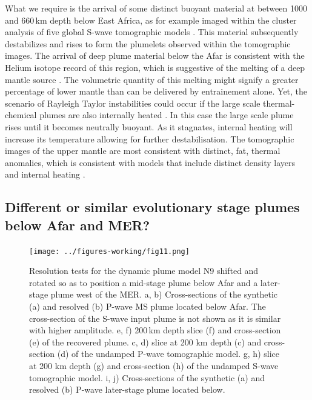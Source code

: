 \documentclass[a4paper,10pt,twocolumn]{paper}
\begin{document}
What we require is the arrival of some distinct buoyant material at between 1000 and 660\,km depth below East Africa, as for example imaged within the cluster analysis of five global S-wave tomographic models \citep{cottaar-2016}. This material subsequently destabilizes and rises to form the plumelets observed within the tomographic images. The arrival of deep plume material below the Afar is consistent with the Helium isotope record of this region, which is suggestive of the melting of a deep mantle source \citep{pik-etal-1999}. The volumetric quantity of this melting might signify a greater percentage of lower mantle than can be delivered by entrainement alone. Yet, the scenario of Rayleigh Taylor instabilities could occur if the large scale thermal-chemical plumes are also internally heated \citep{fourel-etal-2017}. In this case the large scale plume rises until it becomes neutrally buoyant. As it stagnates, internal heating will increase its temperature allowing for further destabilisation. The tomographic images of the upper mantle are most consistent with distinct, fat, thermal anomalies, which is consistent with models that include distinct density layers and internal heating \citep{fourel-etal-2017}. 

\subsection{Different or similar evolutionary stage plumes below Afar and MER?}

\begin{figure}
\centering
\texttt{[image: ../figures-working/fig11.png]}
\caption{Resolution tests for the dynamic plume model N9 shifted and rotated so as to position a mid-stage plume below Afar and a later-stage plume west of the MER. a, b) Cross-sections of the synthetic (a) and resolved (b) P-wave MS plume located below Afar. The cross-section of the S-wave input plume is not shown as it is similar with higher amplitude. e, f) 200\,km depth slice (f) and cross-section (e) of the recovered plume. c, d) slice at 200 km depth (c) and cross-section (d) of the undamped P-wave tomographic model. g, h) slice at 200 km depth (g) and cross-section (h) of the undamped S-wave tomographic model. i, j) Cross-sections of the synthetic (a) and resolved (b) P-wave later-stage plume located below.}
\label{fg:10}
\end{figure}
\end{document}
